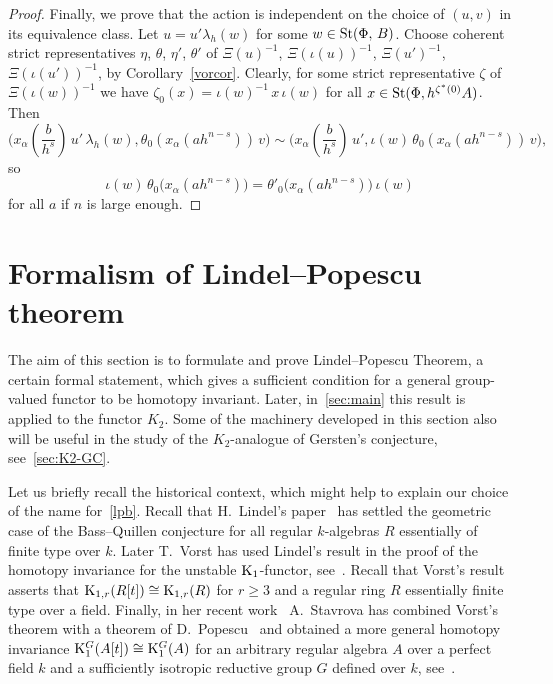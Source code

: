\documentclass[oneside, 11pt]{amsart} \pdfoutput=1
\begin{document}
\begin{proof}
Finally, we prove that the action is independent on the choice of $(u, v)$ in its equivalence class. Let $u = u' \lambda_h(w)$ for some $w \in \mathop{\mathrm{St}}\nolimits(\Phi,\,B)$. Choose coherent strict representatives $\eta$, $\theta$, $\eta'$, $\theta'$ of $\Xi(u)^{-1}$, $\Xi(\iota(u))^{-1}$, $\Xi(u')^{-1}$, $\Xi(\iota(u'))^{-1}$, by Corollary~\ref{vorcor}. Clearly, for some strict representative $\zeta$ of $\Xi(\iota(w))^{-1}$ we have $\zeta_0(x) = \iota(w)^{-1}\, x\, \iota(w)$ for all $x \in \mathop{\mathrm{St}}\nolimits(\Phi, h^{\zeta^*(0)} A)$.
Then
$$\textstyle
\bigl(x_\alpha(\frac b {h^s})\, u'\, \lambda_h(w), \theta_0(x_\alpha(ah^{n - s}))\, v\bigr) \sim \bigl(x_\alpha(\frac b {h^s})\, u', \iota(w)\, \theta_0(x_\alpha(ah^{n - s}))\, v\bigr),
$$
so
$$
\iota(w)\, \theta_0\bigl(x_\alpha(ah^{n-s})\bigr) = \theta'_0\bigl(x_\alpha(ah^{n-s})\bigr)\, \iota(w)
$$
for all \(a\) if \(n\) is large enough.
\end{proof}



\section{Formalism of Lindel--Popescu theorem}
The aim of this section is to formulate and prove Lindel--Popescu Theorem, a certain formal statement, which gives a sufficient condition for a general group-valued functor to be homotopy invariant. Later, in~\cref{sec:main} this result is applied to the functor $K_2$. Some of the machinery developed in this section also will be useful in the study of the $K_2$-analogue of Gersten's conjecture, see~\cref{sec:K2-GC}.

Let us briefly recall the historical context, which might help to explain our choice of the name for~\cref{lpb}. Recall that H.~Lindel's paper~\cite{Li81} has settled the geometric case of the Bass--Quillen conjecture for all regular $k$-algebras $R$ essentially of finite type over $k$. Later T.~Vorst has used Lindel's result in the proof of the homotopy invariance for the unstable ${\mathrm{K}}_1$-functor, see~\cite{Vo81}. Recall that Vorst's result asserts that ${\mathrm{K}}_{1,r}(R[t]) \cong {\mathrm{K}}_{1,r}(R)$ for $r\geq 3$ and a regular ring $R$ essentially finite type over a field. Finally, in her recent work~\cite{Sta14} A.~Stavrova has combined Vorst's theorem with a theorem of D.~Popescu~\cite{Po90} and obtained a more general homotopy invariance ${\mathrm{K}}_1^G(A[t]) \cong {\mathrm{K}}_1^G(A)$ for an arbitrary regular algebra $A$ over a perfect field $k$ and a sufficiently isotropic reductive group $G$ defined over $k$, see~\cite[Theorem~1.3]{Sta14}.
\end{document}
